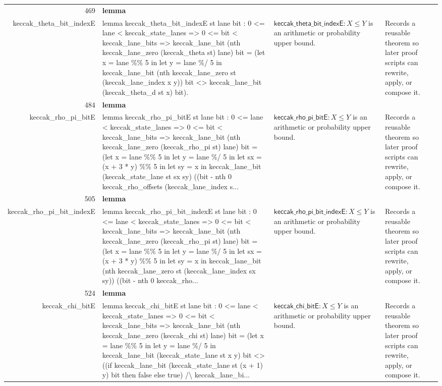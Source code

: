 \documentclass[10pt]{article}
\newcommand{\ec}[1]{\begingroup\ttfamily\scriptsize #1\endgroup}
\begin{document}
\begin{longtable}{r L{0.17\textwidth} L{0.26\textwidth} L{0.27\textwidth} L{0.20\textwidth}}
469 & \textbf{lemma}\\\ec{keccak\_theta\_bit\_indexE} & \ec{lemma keccak\_theta\_bit\_indexE st lane bit : 0 <= lane < keccak\_state\_lanes => 0 <= bit < keccak\_lane\_bits => keccak\_lane\_bit (nth keccak\_lane\_zero (keccak\_theta st) lane) bit = (let x = lane \%\% 5 in let y = lane \%/ 5 in keccak\_lane\_bit (nth keccak\_lane\_zero st (keccak\_lane\_index x y)) bit <> keccak\_lane\_bit (keccak\_theta\_d st x) bit).} & \(\mathsf{keccak\_theta\_bit\_indexE} : X \le Y\) is an arithmetic or probability upper bound. & Records a reusable theorem so later proof scripts can rewrite, apply, or compose it. \\
484 & \textbf{lemma}\\\ec{keccak\_rho\_pi\_bitE} & \ec{lemma keccak\_rho\_pi\_bitE st lane bit : 0 <= lane < keccak\_state\_lanes => 0 <= bit < keccak\_lane\_bits => keccak\_lane\_bit (nth keccak\_lane\_zero (keccak\_rho\_pi st) lane) bit = (let x = lane \%\% 5 in let y = lane \%/ 5 in let sx = (x + 3 * y) \%\% 5 in let sy = x in keccak\_lane\_bit (keccak\_state\_lane st sx sy) ((bit - nth 0 keccak\_rho\_offsets (keccak\_lane\_index s...} & \(\mathsf{keccak\_rho\_pi\_bitE} : X \le Y\) is an arithmetic or probability upper bound. & Records a reusable theorem so later proof scripts can rewrite, apply, or compose it. \\
505 & \textbf{lemma}\\\ec{keccak\_rho\_pi\_bit\_indexE} & \ec{lemma keccak\_rho\_pi\_bit\_indexE st lane bit : 0 <= lane < keccak\_state\_lanes => 0 <= bit < keccak\_lane\_bits => keccak\_lane\_bit (nth keccak\_lane\_zero (keccak\_rho\_pi st) lane) bit = (let x = lane \%\% 5 in let y = lane \%/ 5 in let sx = (x + 3 * y) \%\% 5 in let sy = x in keccak\_lane\_bit (nth keccak\_lane\_zero st (keccak\_lane\_index sx sy)) ((bit - nth 0 keccak\_rho...} & \(\mathsf{keccak\_rho\_pi\_bit\_indexE} : X \le Y\) is an arithmetic or probability upper bound. & Records a reusable theorem so later proof scripts can rewrite, apply, or compose it. \\
524 & \textbf{lemma}\\\ec{keccak\_chi\_bitE} & \ec{lemma keccak\_chi\_bitE st lane bit : 0 <= lane < keccak\_state\_lanes => 0 <= bit < keccak\_lane\_bits => keccak\_lane\_bit (nth keccak\_lane\_zero (keccak\_chi st) lane) bit = (let x = lane \%\% 5 in let y = lane \%/ 5 in keccak\_lane\_bit (keccak\_state\_lane st x y) bit <> ((if keccak\_lane\_bit (keccak\_state\_lane st (x + 1) y) bit then false else true) /\textbackslash{} keccak\_lane\_bi...} & \(\mathsf{keccak\_chi\_bitE} : X \le Y\) is an arithmetic or probability upper bound. & Records a reusable theorem so later proof scripts can rewrite, apply, or compose it. \\

\end{longtable}
\end{document}
